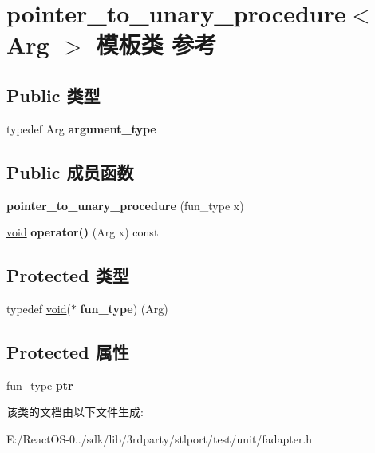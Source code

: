 \hypertarget{classpointer__to__unary__procedure}{}\section{pointer\+\_\+to\+\_\+unary\+\_\+procedure$<$ Arg $>$ 模板类 参考}
\label{classpointer__to__unary__procedure}
\subsection*{Public 类型}
\begin{DoxyCompactItemize}
\item 
\mbox{\label{classpointer__to__unary__procedure_ae6714035f3ba597e9da29e9c8363f5dc}} 
typedef Arg {\bfseries argument\+\_\+type}
\end{DoxyCompactItemize}
\subsection*{Public 成员函数}
\begin{DoxyCompactItemize}
\item 
\mbox{\label{classpointer__to__unary__procedure_ad8beefc8d5af098fe58079bcf0447c38}} 
{\bfseries pointer\+\_\+to\+\_\+unary\+\_\+procedure} (fun\+\_\+type x)
\item 
\mbox{\label{classpointer__to__unary__procedure_a9dc8361decc948c830837829abeeb7b7}} 
\hyperlink{interfacevoid}{void} {\bfseries operator()} (Arg x) const
\end{DoxyCompactItemize}
\subsection*{Protected 类型}
\begin{DoxyCompactItemize}
\item 
\mbox{\label{classpointer__to__unary__procedure_ae42bfb9ab349f6a5789918af1c5b5000}} 
typedef \hyperlink{interfacevoid}{void}($\ast$ {\bfseries fun\+\_\+type}) (Arg)
\end{DoxyCompactItemize}
\subsection*{Protected 属性}
\begin{DoxyCompactItemize}
\item 
\mbox{\label{classpointer__to__unary__procedure_a771a58b5b401722aef4d1b4d0fb07268}} 
fun\+\_\+type {\bfseries ptr}
\end{DoxyCompactItemize}


该类的文档由以下文件生成\+:\begin{DoxyCompactItemize}
\item 
E\+:/\+React\+O\+S-\/0../sdk/lib/3rdparty/stlport/test/unit/fadapter.\+h\end{DoxyCompactItemize}
